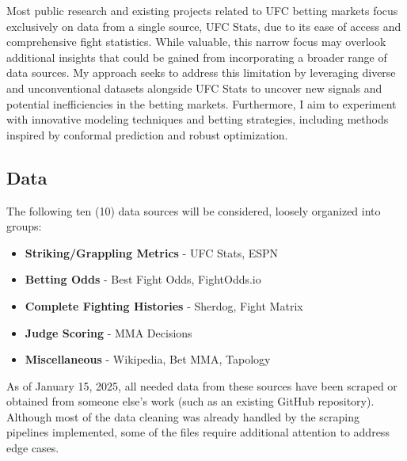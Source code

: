 \documentclass[
  letterpaper,
  DIV=11,
  numbers=noendperiod]{scrartcl}
\providecommand{\tightlist}{%
  \setlength{\itemsep}{0pt}\setlength{\parskip}{0pt}}\usepackage{longtable,booktabs,array}
\begin{document}
Most public research and existing projects related to UFC betting markets focus exclusively on data from a single source, UFC Stats, due to its ease of access and comprehensive fight statistics. While valuable, this narrow focus may overlook additional insights that could be gained from incorporating a broader range of data sources. My approach seeks to address this limitation by leveraging diverse and unconventional datasets alongside UFC Stats to uncover new signals and potential inefficiencies in the betting markets. Furthermore, I aim to experiment with innovative modeling techniques and betting strategies, including methods inspired by conformal prediction and robust optimization.


\subsection{Data}\label{data}

The following ten (10) data sources will be considered, loosely organized into groups:

\begin{itemize}
\tightlist
    \item \textbf{Striking/Grappling Metrics} - UFC Stats, ESPN
    \item \textbf{Betting Odds} - Best Fight Odds, FightOdds.io
    \item \textbf{Complete Fighting Histories} - Sherdog, Fight Matrix
    \item \textbf{Judge Scoring} - MMA Decisions
    \item \textbf{Miscellaneous} - Wikipedia, Bet MMA, Tapology
\end{itemize}

As of January 15, 2025, all needed data from these sources have been scraped or obtained from someone else's work (such as an existing GitHub repository). Although most of the data cleaning was already handled by the scraping pipelines implemented, some of the files require additional attention to address edge cases.
\end{document}

